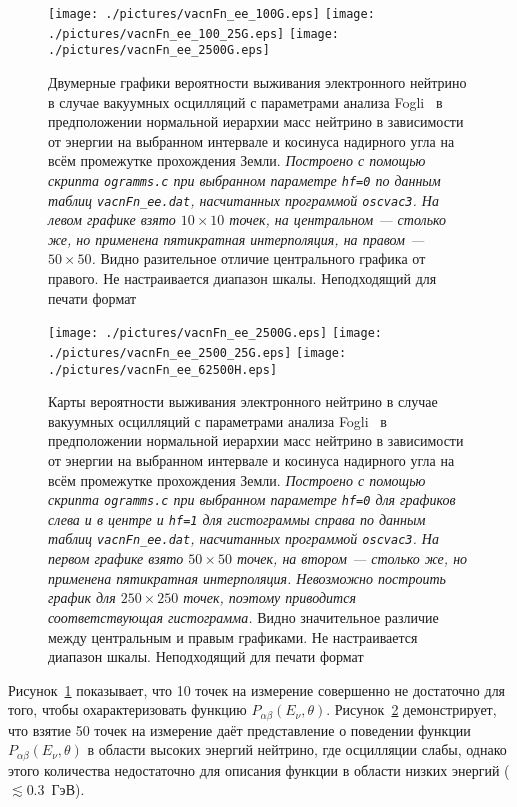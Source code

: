 \begin{figure}[!ht]
\texttt{[image: ./pictures/vacnFn\_ee\_100G.eps]}
\texttt{[image: ./pictures/vacnFn\_ee\_100\_25G.eps]}
\texttt{[image: ./pictures/vacnFn\_ee\_2500G.eps]}
\caption{Двумерные графики вероятности выживания электронного нейтрино в случае вакуумных осцилляций с параметрами анализа Fogli~\cite{Fogli:2012ua} в предположении нормальной иерархии масс нейтрино в зависимости от энергии на выбранном интервале и косинуса надирного угла на всём промежутке прохождения Земли. \textit{Построено с помощью скрипта \texttt{ogramms.c} при выбранном параметре \texttt{hf=0} по данным таблиц \texttt{vacnFn\_ee.dat}, насчитанных программой \texttt{oscvac3}. На левом графике взято $10\times10$ точек, на центральном --- столько же, но применена пятикратная интерполяция, на правом --- $50\times50$.} Видно разительное отличие центрального графика от правого. {\color{red}Не настраивается диапазон шкалы.} {\color{magenta}Неподходящий для печати формат}}
\label{vacnFn_ee_10vs50}
\end{figure}
\begin{figure}[!ht]
\vspace*{-0.5cm}
\texttt{[image: ./pictures/vacnFn\_ee\_2500G.eps]}
\texttt{[image: ./pictures/vacnFn\_ee\_2500\_25G.eps]}
\texttt{[image: ./pictures/vacnFn\_ee\_62500H.eps]}
\caption{Карты вероятности выживания электронного нейтрино в случае вакуумных осцилляций с параметрами анализа Fogli~\cite{Fogli:2012ua} в предположении нормальной иерархии масс нейтрино в зависимости от энергии на выбранном интервале и косинуса надирного угла на всём промежутке прохождения Земли. \textit{Построено с помощью скрипта \texttt{ogramms.c} при выбранном параметре \texttt{hf=0} для графиков слева и в центре и \texttt{hf=1} для гистограммы справа по данным таблиц \texttt{vacnFn\_ee.dat}, насчитанных программой \texttt{oscvac3}. На первом графике взято $50\times50$ точек, на втором --- столько же, но применена пятикратная интерполяция. Невозможно построить график для $250\times250$ точек, поэтому приводится соответствующая гистограмма.} Видно значительное различие между центральным и правым графиками. {\color{red}Не настраивается диапазон шкалы.} {\color{magenta}Неподходящий для печати формат}}
\label{vacnFn_ee_50vs250}
\end{figure}

Рисунок~\ref{vacnFn_ee_10vs50} показывает, что 10 точек на измерение совершенно не достаточно для того, чтобы охарактеризовать функцию $P_{\alpha\beta}(E_{\nu},\theta)$. Рисунок~\ref{vacnFn_ee_50vs250} демонстрирует, что взятие 50 точек на измерение даёт представление о поведении функции $P_{\alpha\beta}(E_{\nu},\theta)$ в области высоких энергий нейтрино, где осцилляции слабы, однако этого количества недостаточно для описания функции в области низких энергий ($\lesssim{}0.3$~ГэВ).

